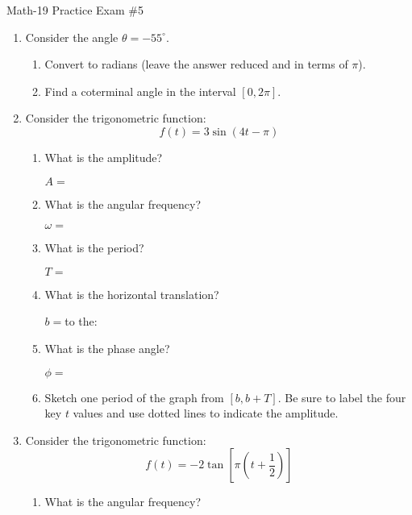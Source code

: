 \documentclass[letterpaper,12pt,fleqn]{article}
\renewcommand{\o}{\theta}
\newcommand{\w}{\omega}
\newcommand{\p}{\phi}
\begin{document}
\begin{center}
\Large Math-19 Practice Exam \#5
\end{center}

\vspace{0.5in}

\begin{enumerate}

\item Consider the angle $\o=-55^{\circ}$.
  \begin{enumerate}
  \item Convert to radians (leave the answer reduced and in terms of $\pi$).

  \item Find a coterminal angle in the interval $[0,2\pi]$.
  \end{enumerate}

\item Consider the trigonometric function:
  \[f(t)=3\sin(4t-\pi)\]
  \begin{enumerate}
  \item What is the amplitude?

    $A=$

  \item What is the angular frequency?

    $\w=$

  \item What is the period?

    $T=$
    
  \item What is the horizontal translation?

    $b=$\hspace{1in}to the:
    
  \item What is the phase angle?

    $\p=$

  \item Sketch one period of the graph from $[b,b+T]$. Be sure to label the
    four key $t$ values and use dotted lines to indicate the amplitude.

  \end{enumerate}

\item Consider the trigonometric function:
  \[f(t)=-2\tan\left[\pi\left(t+\frac{1}{2}\right)\right]\]
  \begin{enumerate}
  \item What is the angular frequency?


\end{enumerate}
\end{enumerate}
\end{document}
